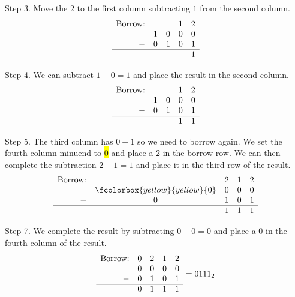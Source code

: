 Step 3. Move the \(2\) to the first column subtracting \(1\) from the second column. 
\[
\begin{array}{rcccc}
    \text{Borrow:} &   &   & 1 & 2 \\ %
                   & 1 & 0 & 0 & 0 \\ %
                 - & 0 & 1 & 0 & 1 \\ %
  \hline
                   &   &   &   & 1 \\ %
\end{array}
\]



Step 4. We can subtract \(1-0=1\) and place the result in the second column.
\[
\begin{array}{rcccc}
    \text{Borrow:} &   &   & 1 & 2 \\ %
                   & 1 & 0 & 0 & 0 \\ %
                 - & 0 & 1 & 0 & 1 \\ %
  \hline
                   &   &   & 1 & 1 \\ %
\end{array}
\]

Step 5. The third column has \(0-1\) so we need to borrow again. We set the fourth column minuend to \colorbox{yellow}{0} and place a 2 in the borrow row. We can then complete the subtraction \(2-1=1\) and place it in the third row of the result.
\[
\begin{array}{rcccc}
    \text{Borrow:} &   & 2 & 1 & 2 \\ %
                   & \fcolorbox{yellow}{yellow}{0} & 0 & 0 & 0 \\ %
                 - & 0 & 1 & 0 & 1 \\ %
  \hline
                   &   & 1 & 1 & 1 \\ %
\end{array}
\]

Step 7. We complete the result by subtracting \(0-0=0\) and place a 0 in the fourth column of the result.
\[
\begin{array}{rcccc}
    \text{Borrow:} & 0 & 2 & 1 & 2 \\ %
                   & 0 & 0 & 0 & 0 \\ %
                 - & 0 & 1 & 0 & 1 \\ %
  \hline
                   & 0 & 1 & 1 & 1 \\ %
\end{array}= 0111_2
\]

